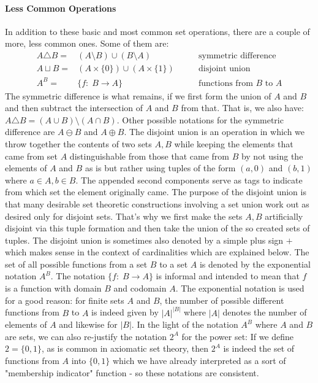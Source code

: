 \paragraph{Less Common Operations}
In addition to these basic and most common set operations, there are a couple of more, less common ones. Some of them are:
\begin{eqnarray}
 A \triangle B =& (A \setminus B) \cup (B \setminus A)      \qquad &\text{symmetric difference} \\
 A \sqcup B    =& (A \times \{0\})  \cup  (A \times \{1\})  \qquad &\text{disjoint union} \\
 A ^ B         =& \{ f: \; B \rightarrow A  \}              \qquad &\text{functions from $B$ to $A$} 
\end{eqnarray}
The symmetric difference is what remains, if we first form the union of $A$ and $B$ and then subtract the intersection of $A$ and $B$ from that. That is, we also have: $A \triangle B = (A \cup B) \setminus (A \cap B)$. Other possible notations for the symmetric difference are $A \ominus B$ and $A \oplus B$. The disjoint union is an operation in which we throw together the contents of two sets $A,B$ while keeping the elements that came from set $A$ distinguishable from those that came from $B$ by not using the elements of $A$ and $B$ as is but rather using tuples of the form $(a,0)$ and $(b,1)$ where $a \in A, b \in B$. The appended second components serve as tags to indicate from which set the element originally came. The purpose of the disjoint union is that many desirable set theoretic constructions involving a set union work out as desired only for disjoint sets. That's why we first make the sets $A,B$ artificially disjoint via this tuple formation and then take the union of the so created sets of tuples. The disjoint union is sometimes also denoted by a simple plus sign $+$ which makes sense in the context of cardinalities which are explained below. The set of all possible functions from a set $B$ to a set $A$ is denoted by the exponential notation $A^B$. The notation $\{ f: \; B \rightarrow A \}$ is informal and intended to mean that $f$ is a function with domain $B$ and codomain $A$. The exponential notation is used for a good reason: for finite sets $A$ and $B$, the number of possible different functions from $B$ to $A$ is indeed given by $|A|^{|B|}$ where $|A|$ denotes the number of elements of $A$ and likewise for $|B|$. In the light of the notation $A^B$ where $A$ and $B$ are sets, we can also re-justify the notation $2^A$ for the power set: If we define $2 = \{0, 1\}$, as is common in axiomatic set theory, then $2^A$ is indeed the set of functions from $A$ into $\{0, 1\}$ which we have already interpreted as a sort of "membership indicator" function - so these notations are consistent.

